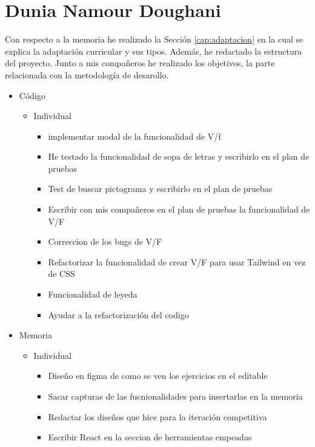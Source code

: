 \section{Dunia Namour Doughani}
Con respecto a la memoria he realizado la Sección \ref{cap:adaptacion} en la cual se explica la adaptación curricular y sus tipos. Además, he redactado la estructura del proyecto. Junto a mis compañeros he realizado los objetivos, la parte relacionada con la metodología de desarollo.
\begin{itemize}
    \item Código
          \begin{itemize}
              \item Individual
                    \begin{itemize}
                        \item implementar modal de la funcionalidad de V/f
                        \item He testado la funcionalidad de sopa de letras y escribirlo en el plan de pruebas
                        \item Test de buscar pictograma y escribirlo en el plan de pruebas
                        \item Escribir con mis compañeros en el plan de pruebas la funcionalidad de V/F
                        \item Correccion de los bugs de V/F
                        \item Refactorizar la funcionalidad de crear V/F para usar Tailwind en vez de CSS
                        \item Funcionalidad de leyeda
                        \item Ayudar a la refactorización del codigo
                    \end{itemize}
          \end{itemize}
    \item Memoria
          \begin{itemize}
              \item Individual
                    \begin{itemize}
                        \item Diseño en figma de como se ven los ejercicios en el editable
                        \item Sacar capturas de las fucnionalidades para insertarlas en la memoria
                        \item Redactar los diseños que hice para la iteración competitiva
                        \item Escribir React en la seccion de herramientas empeadas


\end{itemize}
\end{itemize}
\end{itemize}
